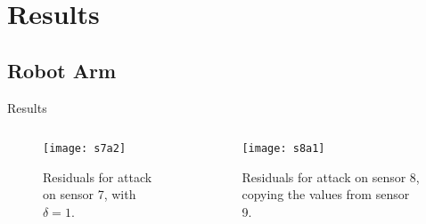 
\section{Results}%
\label{sec:results}

\subsection{Robot Arm}%
\label{subsec:robot-arm}

\begin{slide}{Results}
  \begin{columns}[c]
    \begin{column}{0.55\textwidth}
      \begin{figure}[ht!]
        \centering
        \texttt{[image: s7a2]}
        \caption{Residuals for attack on sensor 7, with \(\delta=1\).}%
        \label{fig:s7a2}
      \end{figure}
    \end{column}%
    \hfill%
    \begin{column}{0.55\textwidth}
      \begin{figure}[ht!]
        \centering
        \texttt{[image: s8a1]}
        \caption{Residuals for attack on sensor 8, copying the values from sensor 9.}%
        \label{fig:s8a1}
      \end{figure}
    \end{column}%
  \end{columns}
\end{slide}
